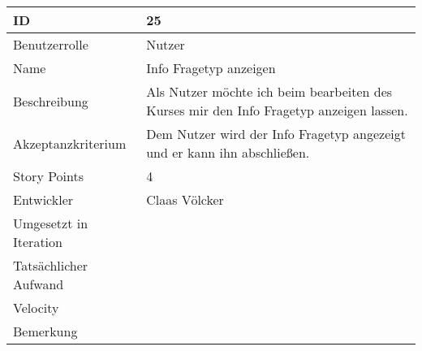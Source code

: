 \begin{tabularx}{\textwidth}{|p{}|X|}
	\hline
	ID & 25\\
	\hline
	Benutzerrolle & Nutzer\\
	\hline
	Name & Info Fragetyp anzeigen\\
	\hline
	Beschreibung & Als Nutzer möchte ich beim bearbeiten des Kurses mir den Info Fragetyp anzeigen lassen.\\
	\hline
	Akzeptanzkriterium & Dem Nutzer wird der Info Fragetyp angezeigt und er kann ihn abschließen.\\
	\hline
	Story Points & 4 \\
	\hline
	Entwickler & Claas Völcker \\
	\hline
	Umgesetzt in Iteration & \\
	\hline
	Tatsächlicher Aufwand & \\
	\hline
	Velocity & \\
	\hline
	Bemerkung & \\
	\hline
\end{tabularx}
\vspace{20pt}
